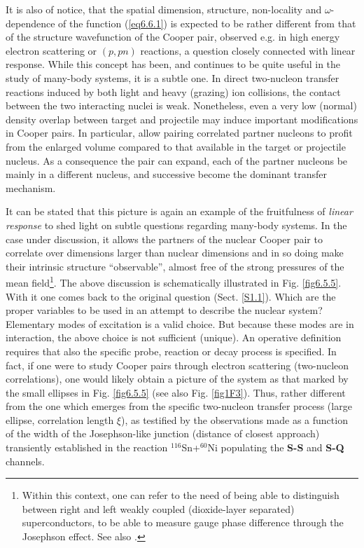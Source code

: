 It is also of notice, that the spatial dimension, structure, non-locality and $\omega$-dependence of the function (\ref{eq6.6.1}) is expected to be rather different from that of the structure wavefunction of the Cooper pair, observed e.g. in high energy electron scattering or $(p,pn)$ reactions, a question closely connected with linear response. While this concept has been, and continues to be quite useful in the study of many-body systems, it is a subtle one. In direct two-nucleon transfer reactions induced by both light and heavy (grazing) ion  collisions, the contact between the two interacting nuclei is weak. Nonetheless, even a very low (normal) density overlap between target and projectile may induce important modifications in Cooper pairs. In particular, allow pairing correlated partner nucleons  to profit from the enlarged volume  compared to that available in the target or projectile nucleus. As a consequence the pair can  expand, each of the partner nucleons be mainly in a different nucleus, and successive become the dominant transfer mechanism. 


It can be stated that this picture is again an example of the fruitfulness of \textit{linear response} to shed light on subtle questions regarding many-body systems. In the case under discussion, it allows the partners of the nuclear Cooper pair to correlate over dimensions larger than nuclear dimensions and in so doing make their intrinsic structure ``observable'', almost free of the strong pressures of the  mean field\footnote{Within this context, one can refer to  the need of being able to distinguish between   right and left weakly coupled (dioxide-layer separated) superconductors,  to be able to measure gauge phase difference through the Josephson effect. See also \cite{Magierski:17}.}. The above discussion is schematically illustrated in Fig. \ref{fig6.5.5}. With it one comes back to the original question (Sect. \ref{S1.1}). Which are the proper variables to be used in an attempt to describe the nuclear system? Elementary modes of excitation is a valid choice. But because these modes are in interaction, the above choice is not sufficient (unique). An operative definition requires that also the specific probe, reaction or decay process is specified. In fact, if one were to study Cooper pairs through electron scattering (two-nucleon correlations), one would likely obtain a picture of the system as that marked by the small ellipses in Fig. \ref{fig6.5.5} (see also Fig. \ref{fig1F3}). Thus, rather different from the one  which emerges from the specific two-nucleon transfer process (large ellipse, correlation length $\xi$), as testified by the observations made as a function of the width of the Josephson-like junction (distance of closest approach) transiently established in the reaction $^{116}$Sn+$^{60}$Ni populating the \textbf{S-S} and \textbf{S-Q} channels.  
